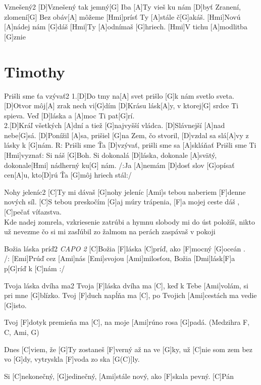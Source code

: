 \documentclass[12pt]{article}
\begin{document}
\begin{song}{Vznešený}{2}
	[D]Vznešený tak jemný[G]
	Iba [A]Ty vieš ku nám [D]byť
	Zranení, zlomení[G]
	Bez obáv[A] môžeme [Hmi]prísť
	Ty [A]stále č[G]akáš. [Hmi]Novú [A]nádej nám [G]dáš
	[Hmi]Ty [A]odnímaš [G]hriech. [Hmi]V tichu [A]modlitba [G]znie
	\columnbreak
\end{song}

\newpage

\section{Timothy}

\begin{song}{Prišli sme ťa vzývať}{2}
	1.[D]Do tmy na[A] svet 
	prišlo [G]k nám svetlo sveta.
	[D]Otvor môj[A] zrak nech vi[G]dím
	[D]Krásu lásk[A]y, v ktorej[G] srdce Ti spieva.
	Veď [D]láska a [A]moc Ti pat[G]rí.
	\\
	2.[D]Kráľ všetkých [A]dní 
	a tiež [G]najvyšší vládca.
	[D]Slávnejší [A]nad nebe[G]sá.
	[D]Ponížil [A]sa, prišiel [G]na Zem, čo stvoril,
	[D]vzdal sa slá[A]vy z lásky k [G]nám.
	\columnbreak
	R: Prišli sme Ťa [D]vzývať, 
	prišli sme sa [A]skláňať
	Prišli sme Ti [Hmi]vyznať: Si náš [G]Boh.
	Si dokonalá [D]láska, dokonale [A]svätý,
	dokonale[Hmi] nádherný ku[G] nám.
	/:Ja [A]nemám [D]dosť slov [G]opísať 
	cen[A]u, kto[D]rú Ťa [G]môj hriech stál:/
\end{song}

\begin{song}{Nohy jeleníc}{2}
	[C]Ty mi dávaš [G]nohy jeleníc
	[Ami]s tebou naberiem [F]denne nových síl.
	[C]S tebou preskočím [G]aj múry trápenia,
	[F]a mojej ceste dáš , [C]pečať víťazstva.
	\\
	Kde nadej zomrela, vzkriesenie zatrúbi
	a hymnu slobody mi do úst položíš,
	nikto už nevezme čo si mi zasľúbil
	zo žalmom na perách zaspávaš v pokoji
\end{song}

\begin{song}{Božia láska príď}{2}
	\textit{CAPO 2}
	[C]Božia [F]láska [C]príď, ako [F]mocný [G]oceán .
	\\
	/: [Emi]Prúď cez [Ami]nás [Emi]svojou [Ami]milosťou, 
	Božia [Dmi]lásk[F]a p[G]ríď k [C]nám :/
	\columnbreak
\end{song}

\begin{song}{Tvoja láska dvíha ma}{2}
Tvoja [F]láska dvíha ma [C], keď k Tebe [Ami]volám, si pri mne [G]blízko.
Tvoj [F]duch napĺňa ma [C], po Tvojich [Ami]cestách ma vedie [G]isto.

Tvoj [F]dotyk premieňa ma [C], 
na moje [Ami]rúno rosa [G]padá.
\columnbreak
(Medzihra F, C, Ami, G)

Dnes [C]viem, že [G]Ty zostaneš [F]verný až na ve [G]ky,
už [C]nie som zem bez vo [G]dy, vytryskla [F]voda zo ska [G(C)]ly.

Si [C]nekonečný, [G]jedinečný, [Ami]stále nový, ako [F]skala pevný. [C]Pán
\end{song}
\end{document}
